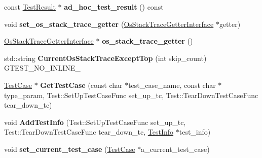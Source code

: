 \begin{DoxyCompactItemize}
const \hyperlink{classtesting_1_1_test_result}{Test\+Result} $\ast$ {\bfseries ad\+\_\+hoc\+\_\+test\+\_\+result} () const
\item 
\mbox{\label{classtesting_1_1internal_1_1_unit_test_impl_a3306f7d2b19bca54b841006e4a2e0260}} 
void {\bfseries set\+\_\+os\+\_\+stack\+\_\+trace\+\_\+getter} (\hyperlink{classtesting_1_1internal_1_1_os_stack_trace_getter_interface}{Os\+Stack\+Trace\+Getter\+Interface} $\ast$getter)
\item 
\mbox{\label{classtesting_1_1internal_1_1_unit_test_impl_a71753679854f7fbba6c1568eb422fecb}} 
\hyperlink{classtesting_1_1internal_1_1_os_stack_trace_getter_interface}{Os\+Stack\+Trace\+Getter\+Interface} $\ast$ {\bfseries os\+\_\+stack\+\_\+trace\+\_\+getter} ()
\item 
\mbox{\label{classtesting_1_1internal_1_1_unit_test_impl_a61c0a51ac4e57d9f884f646ca6dd2210}} 
std\+::string {\bfseries Current\+Os\+Stack\+Trace\+Except\+Top} (int skip\+\_\+count) G\+T\+E\+S\+T\+\_\+\+N\+O\+\_\+\+I\+N\+L\+I\+N\+E\+\_\+
\item 
\mbox{\label{classtesting_1_1internal_1_1_unit_test_impl_ac5684d824a59e963cb3274c79d0b6df3}} 
\hyperlink{classtesting_1_1_test_case}{Test\+Case} $\ast$ {\bfseries Get\+Test\+Case} (const char $\ast$test\+\_\+case\+\_\+name, const char $\ast$type\+\_\+param, Test\+::\+Set\+Up\+Test\+Case\+Func set\+\_\+up\+\_\+tc, Test\+::\+Tear\+Down\+Test\+Case\+Func tear\+\_\+down\+\_\+tc)
\item 
\mbox{\label{classtesting_1_1internal_1_1_unit_test_impl_a1cc87dfc91377ebec4a3ff4192dfcba9}} 
void {\bfseries Add\+Test\+Info} (Test\+::\+Set\+Up\+Test\+Case\+Func set\+\_\+up\+\_\+tc, Test\+::\+Tear\+Down\+Test\+Case\+Func tear\+\_\+down\+\_\+tc, \hyperlink{classtesting_1_1_test_info}{Test\+Info} $\ast$test\+\_\+info)
\item 
\mbox{\label{classtesting_1_1internal_1_1_unit_test_impl_a7f0e79bdabd28819cc857e316a36a350}} 
void {\bfseries set\+\_\+current\+\_\+test\+\_\+case} (\hyperlink{classtesting_1_1_test_case}{Test\+Case} $\ast$a\+\_\+current\+\_\+test\+\_\+case)

\end{DoxyCompactItemize}

